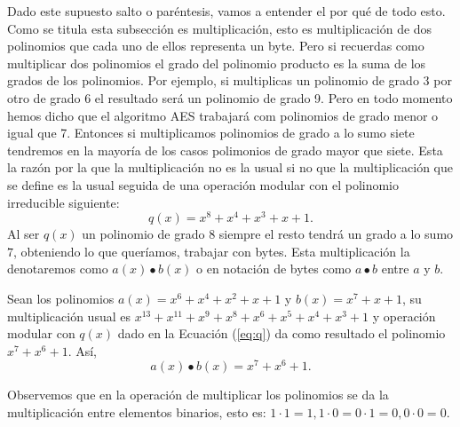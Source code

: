 Dado este supuesto salto o paréntesis, vamos a entender el por qué de todo esto. Como se titula esta subsección es multiplicación, esto es multiplicación de dos polinomios que cada uno de ellos representa un byte. Pero si recuerdas como multiplicar dos polinomios el grado del polinomio producto es la suma de los grados de los polinomios. Por ejemplo, si multiplicas un polinomio de grado 3 por otro de grado 6 el resultado será un polinomio de grado 9. Pero en todo momento hemos dicho que el algoritmo AES trabajará com polinomios de grado menor o igual que 7. Entonces si multiplicamos polinomios de grado a lo sumo siete tendremos en la mayoría de los casos polimonios de grado mayor que siete. Esta  la razón por la que la multiplicación no es la usual si no que la multiplicación que se define es la usual seguida de  una operación modular con el polinomio irreducible siguiente:
\begin{equation}\label{eq:q}
q(x)=x^8+x^4+x^3+x+1.
\end{equation} Al ser $q(x)$ un polinomio de grado $8$ siempre el resto tendrá un grado a lo sumo $7$, obteniendo lo que queríamos, trabajar con bytes. Esta multiplicación la denotaremos como $a(x) \bullet b(x)$ o en notación de bytes como $a\bullet b$ entre $a$ y $b$.
\begin{example}
Sean los polinomios $a(x)=x^6+x^4+x^2+x+1$ y $b(x)=x^7+x+1$, su multiplicación usual  es \mbox{$x^{13}+ x^{11}+x^9+x^8+ x^6+x^5+x^4+x^3+1$} y operación modular con $q(x)$ dado en la Ecuación (\ref{eq:q}) da como resultado el polinomio  \mbox{$x^7+x^6+1$}. Así,
$$
a(x)\bullet b(x)=x^7+x^6+1.
$$
\end{example}
Observemos que en la operación de multiplicar los polinomios se da la multiplicación entre elementos binarios, esto es: $1 \cdot 1=1, 1 \cdot 0= 0\cdot 1= 0, 0 \cdot 0 =0$.



